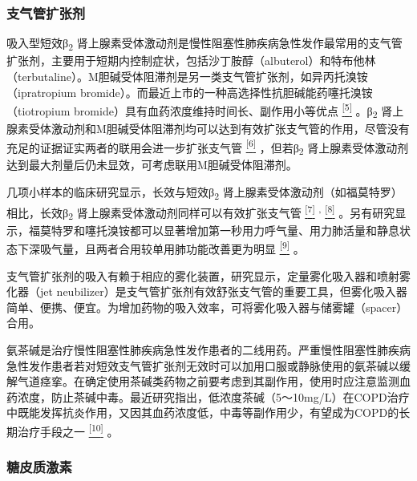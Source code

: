 \subsubsection{支气管扩张剂}

吸入型短效β\textsubscript{2}
肾上腺素受体激动剂是慢性阻塞性肺疾病急性发作最常用的支气管扩张剂，主要用于短期内控制症状，包括沙丁胺醇（albuterol）和特布他林（terbutaline）。M胆碱受体阻滞剂是另一类支气管扩张剂，如异丙托溴铵（ipratropium
bromide）。而最近上市的一种高选择性抗胆碱能药噻托溴铵（tiotropium
bromide）具有血药浓度维持时间长、副作用小等优点
\protect\hyperlink{text00012.htmlux5cux23ch5-11}{\textsuperscript{{[}5{]}}}
。β\textsubscript{2}
肾上腺素受体激动剂和M胆碱受体阻滞剂均可以达到有效扩张支气管的作用，尽管没有充足的证据证实两者的联用会进一步扩张支气管
\protect\hyperlink{text00012.htmlux5cux23ch6-11}{\textsuperscript{{[}6{]}}}
，但若β\textsubscript{2}
肾上腺素受体激动剂达到最大剂量后仍未显效，可考虑联用M胆碱受体阻滞剂。

几项小样本的临床研究显示，长效与短效β\textsubscript{2}
肾上腺素受体激动剂（如福莫特罗）相比，长效β\textsubscript{2}
肾上腺素受体激动剂同样可以有效扩张支气管
\protect\hyperlink{text00012.htmlux5cux23ch7-11}{\textsuperscript{{[}7{]}}}
\textsuperscript{,}
\protect\hyperlink{text00012.htmlux5cux23ch8-11}{\textsuperscript{{[}8{]}}}
。另有研究显示，福莫特罗和噻托溴铵都可以显著增加第一秒用力呼气量、用力肺活量和静息状态下深吸气量，且两者合用较单用肺功能改善更为明显
\protect\hyperlink{text00012.htmlux5cux23ch9-11}{\textsuperscript{{[}9{]}}}
。

支气管扩张剂的吸入有赖于相应的雾化装置，研究显示，定量雾化吸入器和喷射雾化器（jet
neubilizer）是支气管扩张剂有效舒张支气管的重要工具，但雾化吸入器简单、便携、便宜。为增加药物的吸入效率，可将雾化吸入器与储雾罐（spacer）合用。

氨茶碱是治疗慢性阻塞性肺疾病急性发作患者的二线用药。严重慢性阻塞性肺疾病急性发作患者若对短效支气管扩张剂无效时可以加用口服或静脉使用的氨茶碱以缓解气道痉挛。在确定使用茶碱类药物之前要考虑到其副作用，使用时应注意监测血药浓度，防止茶碱中毒。最近研究指出，低浓度茶碱（5～10mg/L）在COPD治疗中既能发挥抗炎作用，又因其血药浓度低，中毒等副作用少，有望成为COPD的长期治疗手段之一
\protect\hyperlink{text00012.htmlux5cux23ch10-11}{\textsuperscript{{[}10{]}}}
。

\subsubsection{糖皮质激素}

